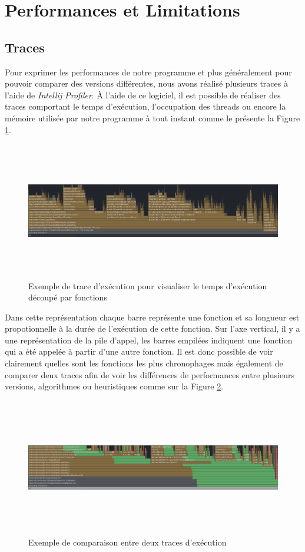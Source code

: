 \documentclass{article}
\begin{document}
\section{Performances et Limitations}
\subsection{Traces}
Pour exprimer les performances de notre programme et plus généralement pour pouvoir comparer des versions différentes, nous avons réalisé plusieurs
traces à l'aide de \textit{Intellij Profiler}. À l'aide de ce logiciel, il est possible de réaliser des traces comportant le temps d'exécution, l'occupation des threads
ou encore la mémoire utilisée par notre programme à tout instant comme le présente la Figure \ref{trace_ex}.

\begin{figure}[h]
    \centering
    \includegraphics[width=\textwidth,height=6.0cm,keepaspectratio]{trace_example.png}
    \caption{Exemple de trace d'exécution pour visualiser le temps d'exécution découpé par fonctions}
    \label{trace_ex}
\end{figure}
\FloatBarrier

Dans cette représentation chaque barre représente une fonction et sa longueur est propotionnelle à la durée de l'exécution de cette fonction. Sur l'axe vertical,
il y a une représentation de la pile d'appel, les barres empilées indiquent une fonction qui a été appelée à partir d'une autre fonction.
Il est donc possible de voir clairement quelles sont les fonctions les plus chronophages mais également 
de comparer deux traces afin de voir les différences de performances entre plusieurs versions, algorithmes ou heuristiques comme sur la Figure \ref{trace_ex2}.

\begin{figure}[h]
    \centering
    \includegraphics[width=\textwidth,height=6.0cm,keepaspectratio]{trace_ex2.png}
    \caption{Exemple de comparaison entre deux traces d'exécution}
    \label{trace_ex2}
\end{figure}
\FloatBarrier
\end{document}
